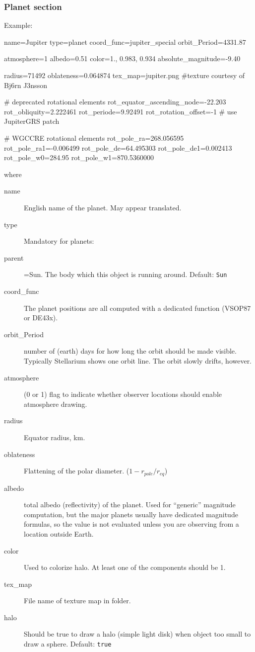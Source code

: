 \subsubsection{Planet section}
\label{sec:ssystem.ini:Planet}

Example:
\begin{configfile}
[jupiter]
name=Jupiter
type=planet
coord_func=jupiter_special
orbit_Period=4331.87

atmosphere=1
albedo=0.51
color=1., 0.983, 0.934
absolute_magnitude=-9.40

radius=71492
oblateness=0.064874
tex_map=jupiter.png #texture courtesy of Bj\xf6rn J\xf3nsson

# deprecated rotational elements
rot_equator_ascending_node=-22.203
rot_obliquity=2.222461
rot_periode=9.92491
rot_rotation_offset=-1 # use JupiterGRS patch

# WGCCRE rotational elements
rot_pole_ra=268.056595
rot_pole_ra1=-0.006499
rot_pole_de=64.495303
rot_pole_de1=0.002413
rot_pole_w0=284.95
rot_pole_w1=870.5360000

\end{configfile}


where 
\begin{description}
\item[name] English name of the planet. May appear translated. 
\item[type] Mandatory for planets: \value{planet}
\item[parent]=Sun. The body which this object is running around. Default: \texttt{Sun}
\item[coord\_func] The planet positions are all computed with a dedicated function (VSOP87 or DE43x). 
\item[orbit\_Period] number of (earth) days for how
  long the orbit should be made visible. Typically Stellarium shows
  one orbit line. The orbit slowly drifts, however.

\item[atmosphere] (0 or 1) flag to indicate whether observer locations should enable atmosphere drawing.

\item[radius] Equator radius, km.
\item[oblateness] Flattening of the polar diameter. ($1-r_{pole}/r_{eq}$)
\item[albedo] total albedo (reflectivity) of the planet. Used for ``generic''
  magnitude computation, but the major planets usually have dedicated
  magnitude formulas, so the value is not evaluated unless you are
  observing from a location outside Earth.
\item[color] Used to colorize halo. At least one of the components should be 1.
\item[tex\_map] File name of texture map in  folder.
\item[halo] Should be true to draw a halo (simple light disk) when object too small to draw a sphere. Default: \texttt{true}
\end{description}

